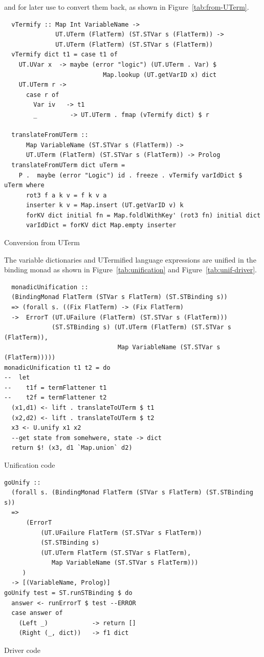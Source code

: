 \documentclass[thesis-solanki.tex]{subfiles}
\begin{document}
%
and for later use to convert them back, as shown in Figure~\ref{tab:from-UTerm}.
%
\begin{code-list}
  \begin{verbatim}
  vTermify :: Map Int VariableName ->
              UT.UTerm (FlatTerm) (ST.STVar s (FlatTerm)) ->
              UT.UTerm (FlatTerm) (ST.STVar s (FlatTerm))
  vTermify dict t1 = case t1 of
    UT.UVar x  -> maybe (error "logic") (UT.UTerm . Var) $
                           Map.lookup (UT.getVarID x) dict
    UT.UTerm r ->
      case r of
        Var iv   -> t1
        _         -> UT.UTerm . fmap (vTermify dict) $ r

  translateFromUTerm ::
      Map VariableName (ST.STVar s (FlatTerm)) ->
      UT.UTerm (FlatTerm) (ST.STVar s (FlatTerm)) -> Prolog
  translateFromUTerm dict uTerm =
    P .  maybe (error "Logic") id . freeze . vTermify varIdDict $ uTerm where
      rot3 f a k v = f k v a
      inserter k v = Map.insert (UT.getVarID v) k
      forKV dict initial fn = Map.foldlWithKey' (rot3 fn) initial dict
      varIdDict = forKV dict Map.empty inserter
  \end{verbatim}
  \caption{Conversion from UTerm}
  \label{tab:from-UTerm}
\end{code-list}

\clearpage
The variable dictionaries and UTermified language expressions are unified in the binding monad as shown in Figure~\ref{tab:unification} and Figure~\ref{tab:unif-driver}.
%
\begin{code-list}
\begin{verbatim}
  monadicUnification ::
  (BindingMonad FlatTerm (STVar s FlatTerm) (ST.STBinding s))
  => (forall s. ((Fix FlatTerm) -> (Fix FlatTerm)
  ->  ErrorT (UT.UFailure (FlatTerm) (ST.STVar s (FlatTerm)))
             (ST.STBinding s) (UT.UTerm (FlatTerm) (ST.STVar s (FlatTerm)),
                               Map VariableName (ST.STVar s (FlatTerm)))))
monadicUnification t1 t2 = do
--  let
--    t1f = termFlattener t1
--    t2f = termFlattener t2
  (x1,d1) <- lift . translateToUTerm $ t1
  (x2,d2) <- lift . translateToUTerm $ t2
  x3 <- U.unify x1 x2
  --get state from somehwere, state -> dict
  return $! (x3, d1 `Map.union` d2)
\end{verbatim}
  \vspace*{-1.0\baselineskip}
  \caption{Unification code}
  \label{tab:unification}

\begin{verbatim}
goUnify ::
  (forall s. (BindingMonad FlatTerm (STVar s FlatTerm) (ST.STBinding s))
  =>
      (ErrorT
          (UT.UFailure FlatTerm (ST.STVar s FlatTerm))
          (ST.STBinding s)
          (UT.UTerm FlatTerm (ST.STVar s FlatTerm),
             Map VariableName (ST.STVar s FlatTerm)))
     )
  -> [(VariableName, Prolog)]
goUnify test = ST.runSTBinding $ do
  answer <- runErrorT $ test --ERROR
  case answer of
    (Left _)            -> return []
    (Right (_, dict))   -> f1 dict
\end{verbatim}
  \vspace*{-1.0\baselineskip}
  \caption{Driver code}
  \label{tab:unif-driver}
\end{code-list}
\end{document}
